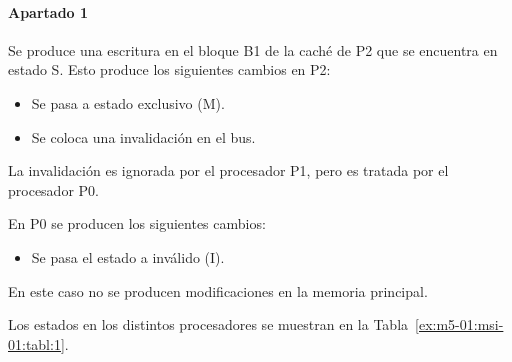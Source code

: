 \begin{acsolution}\end{acsolution}

\paragraph{Apartado 1}

Se produce una escritura en el bloque B1 de la caché de P2 que se encuentra en
estado S. Esto produce los siguientes cambios en P2:

\begin{itemize}

\item Se pasa a estado exclusivo (M).

\item Se coloca una invalidación en el bus.

\end{itemize}

La invalidación es ignorada por el procesador P1, pero es tratada por el
procesador P0.

En P0 se producen los siguientes cambios:

\begin{itemize}

\item Se pasa el estado a inválido (I).

\end{itemize}

En este caso no se producen modificaciones en la memoria principal.

Los estados en los distintos procesadores se muestran en la Tabla~\ref{ex:m5-01:msi-01:tabl:1}.

